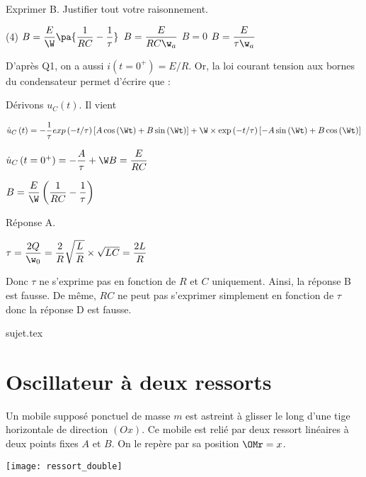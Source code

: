 \documentclass[a4paper, 12pt, final, garamond]{book}
\begin{document}
\QR
{Exprimer B. Justifier tout votre raisonnement.
	\begin{tasks}[label=\protect\fbox{\Alph*}, label-width=4ex,
			item-indent=2.5em, column-sep=4em](4)
		\task $B=\f{E}{\W}\pa{\f{1}{RC}-\f{1}{\tau}}$
		\task $B=\f{E}{{RC\w}_a}$
		\task $B=0$
		\task $B=\f{E}{{\tau \w}_a}$
	\end{tasks}
}
{
	D’après Q1, on a aussi $i\left(t=0^+\right)=E/R$.
	Or, la loi courant tension aux bornes du condensateur permet d’écrire que :


	Dérivons $u_C\left(t\right)$. Il vient

	${\dot{u}}_C\left(t\right)=-\f{1}{\tau}exp\left(-t/\tau\right)\left[A\cos{\left(\Wt\right)}+B\sin{\left(\Wt\right)}\right]+\W\times \exp\left(-t/\tau\right)\left[-A\sin{\left(\Wt\right)}+B\cos{\left(\Wt\right)}\right]$

	{ ${\dot{u}}_C\left(t=0^+\right)=-\f{A}{\tau}+\W B=\f{E}{RC}$}


	{ $B=\f{E}{\W}\left(\f{1}{RC}-\f{1}{\tau}\right)$}

	\medskip

	\noindent
	Réponse A.

	\bigskip

	 {$\tau=\f{2Q}{\w_0}=\f{2}{R}\sqrt{\f{L}{R}}\times\sqrt{LC}=\f{2L}{R}$}

	\noindent
	Donc $\tau$ ne s’exprime pas en fonction de $R$ et $C$ uniquement.
	Ainsi, la réponse B est fausse.
	De même, $RC$ ne peut pas s’exprimer simplement en fonction de $\tau$ donc la réponse D est fausse.
}

\resetQ
{sujet.tex}

\resetQ
\section{Oscillateur à deux ressorts}

Un mobile supposé ponctuel de masse $m$ est astreint à glisser le long d'une
tige horizontale de direction $(Ox)$. Ce mobile est relié par deux ressort
linéaires à deux points fixes $A$ et $B$. On le repère par sa position $\OMr =
	x$.

\begin{center}
	\texttt{[image: ressort\_double]}
\end{center}
\end{document}
